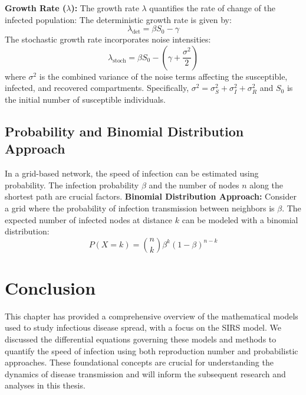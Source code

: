 \noindent
\textbf{Growth Rate ($\lambda$):} The growth rate $\lambda$ quantifies the rate of change of the infected population:
\noindent
The deterministic growth rate is given by:
\[ \lambda_{\text{det}} = \beta S_0 - \gamma \]
The stochastic growth rate incorporates noise intensities:
\[ \lambda_{\text{stoch}} = \beta S_0 - \left(\gamma + \frac{\sigma^2}{2}\right) \]
\noindent
where \(\sigma^2\) is the combined variance of the noise terms affecting the susceptible, infected, and recovered compartments. Specifically, \(\sigma^2 = \sigma_S^2 + \sigma_I^2 + \sigma_R^2\) and $S_0$ is the initial number of susceptible individuals.

\subsection{Probability and Binomial Distribution Approach}
In a grid-based network, the speed of infection can be estimated using probability. The infection probability $\beta$ and the number of nodes $n$ along the shortest path are crucial factors.
\noindent
\textbf{Binomial Distribution Approach:}
Consider a grid where the probability of infection transmission between neighbors is $\beta$. The expected number of infected nodes at distance $k$ can be modeled with a binomial distribution:
\begin{equation}
P(X = k) = \binom{n}{k} \beta^k (1 - \beta)^{n-k}
\end{equation}

\section{Conclusion}
This chapter has provided a comprehensive overview of the mathematical models used to study infectious disease spread, with a focus on the SIRS model. We discussed the differential equations governing these models and methods to quantify the speed of infection using both reproduction number and probabilistic approaches. These foundational concepts are crucial for understanding the dynamics of disease transmission and will inform the subsequent research and analyses in this thesis.